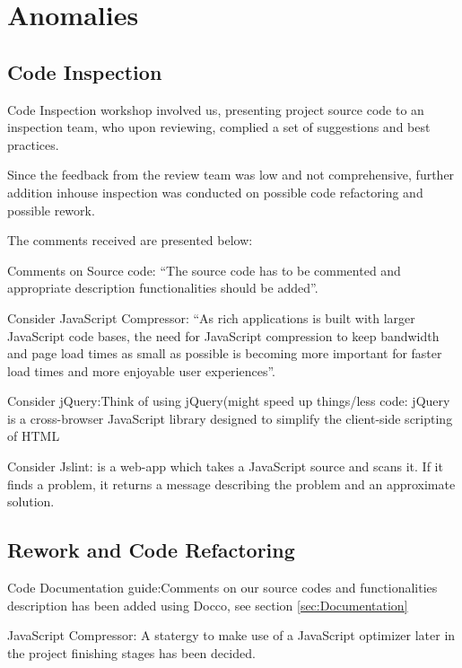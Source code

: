 \section{Anomalies} %
\label{sec:Anomalies}

\subsection{Code Inspection} %
\label{sub:Code Inspection}



Code Inspection workshop involved us, presenting project source code to an inspection team,
who upon reviewing, complied a set of suggestions and best practices.

Since the feedback from the review team was low and not comprehensive, further addition inhouse inspection was conducted on possible 
code refactoring and possible rework.

The comments received are presented below:

Comments on Source code: ``The source code has to be commented and appropriate description functionalities should be added''.

Consider JavaScript Compressor: ``As rich applications is built with larger JavaScript code bases, the need for JavaScript compression 
to keep bandwidth and page load times as small as possible is becoming more important for faster load times and more enjoyable user experiences''.

Consider jQuery:Think of using jQuery(might speed up things/less code: jQuery is a cross-browser JavaScript library designed to simplify the client-side scripting of HTML
 
Consider Jslint: is a web-app which takes a JavaScript source and scans it. If it finds a problem, it returns a message describing the problem and an approximate solution. 

\subsection{Rework and Code Refactoring} %
\label{sub:rework}


Code Documentation guide:Comments on our source codes and functionalities description has been added using Docco, see section \ref{sec:Documentation}

JavaScript Compressor: A statergy to make use of a JavaScript optimizer later in the project finishing stages has been decided.

